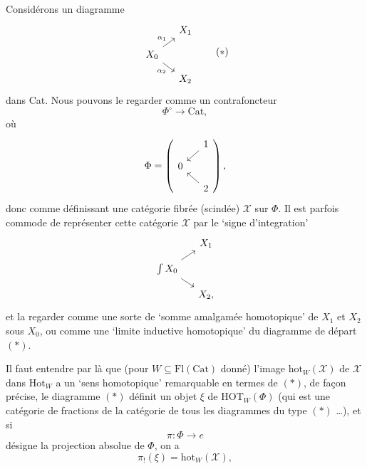 \documentclass[11pt]{article}
\newcommand{\msp}[1]{\marginpar{\footnotesize [#1]}}
\begin{document}
Considérons un diagramme
\[
\begin{tikzcd}[row sep=small, column sep=small]
& X_1 \\
X_0 \arrow[ur, "\alpha_1"] \arrow[dr, "\alpha_2"'] & \\
& X_2
\end{tikzcd}
\tag*{$(*)$}
\]
dans Cat. Nous pouvons le regarder comme un contrafoncteur
\[
\Phi^\circ \longrightarrow \mathrm{Cat},
\]
où
\[
\Phi = \left( \vcenter{\hbox{\begin{tikzcd}[row sep=small, column sep=small]
& 1 \arrow[dl] \\
0 & \\
& 2 \arrow[ul]
\end{tikzcd}}} \right),
\]
donc comme définissant une catégorie fibrée (scindée) $\mathscr{X}$ sur $\Phi$. Il est parfois commode de représenter cette catégorie $\mathscr{X}$ par le ‘signe d'integration’ %
\[
\begin{tikzcd}[row sep=small, column sep=small]
& X_1 \\
\int X_0 \arrow[ur] \arrow[dr] & \\
& X_2,
\end{tikzcd}
\]
et la regarder comme une sorte de ‘somme amalgamée homotopique’ de $X_1$ et $X_2$ sous $X_0$, ou comme une ‘limite inductive homotopique’ du diagramme de départ $(*)$.

\msp{page 122}
Il faut entendre par là que (pour $W \subseteq \mathrm{Fl}(\mathrm{Cat})$ donné) l'image $\mathrm{hot}_W(\mathscr{X})$ de $\mathscr{X}$ dans $\mathrm{Hot}_W$ a un ‘sens homotopique’ remarquable en termes de $(*)$, de façon précise, le diagramme $(*)$ définit un objet $\xi$ de $\mathrm{HOT}_W(\Phi)$ (qui est une catégorie de fractions de la catégorie de tous les diagrammes du type $(*)$ \dots), et si
\[
\pi : \Phi \longrightarrow e
\]
désigne la projection absolue de $\Phi$, on a
\[
\pi_!(\xi) = \mathrm{hot}_W(\mathscr{X}),
\]
\end{document}

